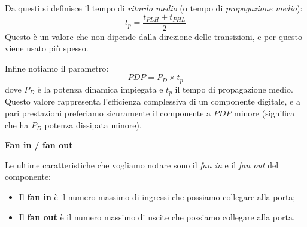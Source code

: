 \documentclass[a4paper,11pt]{article}
\begin{document}
Da questi si definisce il tempo di \textit{ritardo medio} (o tempo di \textit{propagazione medio}):
$$
t_p = \frac{t_{PLH} + t_{PHL}}{2}
$$
Questo è un valore che non dipende dalla direzione delle transizioni, e per questo viene usato più spesso.

Infine notiamo il parametro:
$$
PDP = P_D \times t_p
$$
dove $P_D$ è la potenza dinamica impiegata e $t_p$ il tempo di propagazione medio. Questo valore rappresenta l'efficienza complessiva di un componente digitale, e a pari prestazioni preferiamo sicuramente il componente a $PDP$ minore (significa che ha $P_D$ potenza dissipata minore).

\par\smallskip

\noindent
\textbf{\textsf{Fan in / fan out}}

\noindent
Le ultime caratteristiche che vogliamo notare sono il \textit{fan in} e il \textit{fan out} del componente:
\begin{itemize}
	\item Il \textbf{fan in} è il numero massimo di ingressi che possiamo collegare alla porta;
	\item Il \textbf{fan out} è il numero massimo di uscite che possiamo collegare alla porta.
\end{itemize}
\end{document}

